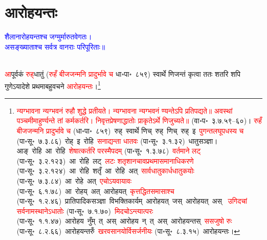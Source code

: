 \section[आरोहयन्तः]{आरोहयन्तः}
\centering\textcolor{blue}{शैलानारोहयन्तश्च जग्मुर्मारुतवेगतः।\nopagebreak\\
असङ्ख्याताश्च सर्वत्र वानराः परिपूरिताः॥}\nopagebreak\\
\\
\begin{sloppypar}\justifying\noindent\hspace{10mm} \textcolor{red}{आ}\-पूर्वकं \textcolor{red}{रुह्‌}\-धातुं (\textcolor{red}{रुहँ बीजजन्मनि प्रादुर्भावे च} धा॰पा॰~८५९) स्वार्थे णिजन्तं कृत्वा ततः शतरि शपि गुणेऽयादेशे प्रथमा\-बहुवचने \textcolor{red}{आरोहयन्तः}।\footnote{\textcolor{red}{न्यग्भावना न्यग्भवनं रुहौ शुद्धे प्रतीयते। न्यग्भावना न्यग्भवनं ण्यन्तेऽपि प्रतिपद्यते॥ अवस्थां पञ्चमीमाहुर्ण्यन्ते तां कर्मकर्तरि। निवृत्तप्रेषणाद्धातोः प्राकृतेऽर्थे णिजुच्यते॥} (वा॰प॰~३.७.५९–६०)। \textcolor{red}{रुहँ बीजजन्मनि प्रादुर्भावे च} (धा॰पा॰~८५९)~\arrow रुह्~\arrow स्वार्थे णिच्~\arrow रुह्~णिच्~\arrow रुह्~इ~\arrow \textcolor{red}{पुगन्त\-लघूपधस्य च} (पा॰सू॰~७.३.८६)~\arrow रोह्~इ~\arrow रोहि~\arrow \textcolor{red}{सनाद्यन्ता धातवः} (पा॰सू॰~३.१.३२)~\arrow धातु\-सञ्ज्ञा। आङ्~रोहि~\arrow आ~रोहि~\arrow \textcolor{red}{शेषात्कर्तरि परस्मैपदम्} (पा॰सू॰~१.३.७८)~\arrow \textcolor{red}{वर्तमाने लट्} (पा॰सू॰~३.२.१२३)~\arrow आ~रोहि~लट्~\arrow \textcolor{red}{लटः शतृशानचावप्रथमा\-समानाधिकरणे} (पा॰सू॰~३.२.१२४)~\arrow आ~रोहि~शतृँ~\arrow आ~रोहि~अत्~\arrow \textcolor{red}{सार्वधातुकार्ध\-धातुकयोः} (पा॰सू॰~७.३.८४)~\arrow आ~रोहे~अत्~\arrow \textcolor{red}{एचोऽयवायावः} (पा॰सू॰~६.१.७८)~\arrow आ~रोहय्~अत्~\arrow आरोहयत्~\arrow \textcolor{red}{कृत्तद्धित\-समासाश्च} (पा॰सू॰~१.२.४६)~\arrow प्रातिपादिक\-सञ्ज्ञा~\arrow विभक्ति\-कार्यम्~\arrow आरोहयत्~जस्~\arrow आरोहयत्~अस्~\arrow \textcolor{red}{ उगिदचां सर्वनामस्थानेऽधातोः} (पा॰सू॰~७.१.७०)~\arrow \textcolor{red}{मिदचोऽन्त्यात्परः} (पा॰सू॰~१.१.४७)~\arrow आरोहय~नुँम्~त्~अस्~\arrow आरोहय~न्~त्~अस्~\arrow आरोहयन्तस्~\arrow \textcolor{red}{ससजुषो रुः} (पा॰सू॰~८.२.६६)~\arrow आरोहयन्तरुँ~\arrow \textcolor{red}{खरवसानयोर्विसर्जनीयः} (पा॰सू॰~८.३.१५)~\arrow आरोहयन्तः।}\end{sloppypar}
